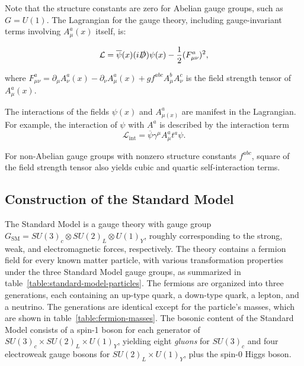 Note that the structure constants are zero for Abelian gauge groups, such as $G=U(1)$. The Lagrangian for the gauge theory, including gauge-invariant terms involving $A^a_{\mu}(x)$ itself, is:

\begin{equation}
	\mathcal{L} = \overline{\psi}(x) (i\slashed{D}) \psi(x) - \frac{1}{2} (F^a_{\mu\nu})^2,
\end{equation}

where $F_{\mu\nu}^a=\partial_{\mu}A^a_{\nu}(x) - \partial_{\nu} A^a_{\mu}(x) + g f^{abc}A_{\mu}^b A_{\nu}^c$ is the field strength tensor of $A^a_{\mu}(x)$. 

The interactions of the fields $\psi(x)$ and $A^a_{\mu(x)}$ are manifest in the Lagrangian. For example, the interaction of $\psi$ with $A^a$ is described by the interaction term
\begin{equation}
	\mathcal{L}_{\mathrm{int}} = \overline{\psi} \gamma^{\mu}A^a_{\mu}t^a \psi.
\end{equation}

For non-Abelian gauge groups with nonzero structure constants $f^{abc}$, square of the field strength tensor also yields cubic and quartic self-interaction terms.



\subsection{Construction of the Standard Model}
The Standard Model is a gauge theory with gauge group $G_{\mathrm{SM}}=SU(3)_c\otimes SU(2)_L \otimes U(1)_Y$, roughly corresponding to the strong, weak, and electromagnetic forces, respectively. The theory contains a fermion field for every known matter particle, with various transformation properties under the three Standard Model gauge groups, as summarized in table~\ref{table:standard-model-particles}. The fermions are organized into three generations, each containing an up-type quark, a down-type quark, a lepton, and a neutrino. The generations are identical except for the particle's masses, which are shown in table~\ref{table:fermion-masses}. The bosonic content of the Standard Model consists of a spin-1 boson for each generator of $SU(3)_c\times SU(2)_L \times U(1)_Y$, yielding eight \emph{gluons} for $SU(3)_c$ and four electroweak gauge bosons for $SU(2)_L\times U(1)_Y$, plus the spin-0 Higgs boson. 


